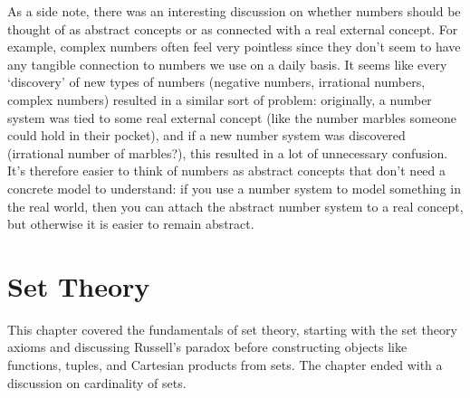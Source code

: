 \documentclass[answers,12pt]{exam}
\begin{document}
As a side note, there was an interesting discussion on whether numbers should be thought of as abstract concepts or as connected with a real external concept.
For example, complex numbers often feel very pointless since they don't seem to have any tangible connection to numbers we use on a daily basis.
It seems like every `discovery' of new types of numbers (negative numbers, irrational numbers, complex numbers) resulted in a similar sort of problem:
originally, a number system was tied to some real external concept (like the number marbles someone could hold in their pocket), and if a new number system was discovered (irrational number of marbles?), this resulted in a lot of unnecessary confusion.
It's therefore easier to think of numbers as abstract concepts that don't need a concrete model to understand:
if you use a number system to model something in the real world, then you can attach the abstract number system to a real concept, but otherwise it is easier to remain abstract.

\section{Set Theory}
This chapter covered the fundamentals of set theory, starting with the set theory axioms and discussing Russell's paradox before constructing objects like functions, tuples, and Cartesian products from sets.
The chapter ended with a discussion on cardinality of sets.
\end{document}
